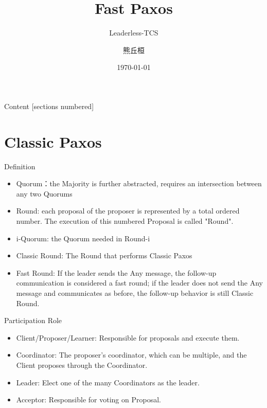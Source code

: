 \documentclass[10pt]{beamer}
\title{Fast Paxos}
\subtitle{Leaderless-TCS}
\date{\today}
\author{熊丘桓}
\institute{NJU-Software Institute}
\begin{document}
\maketitle

\begin{frame}{Content}
    [sections numbered]
    \tableofcontents[hideallsubsections]
\end{frame}

\section{Classic Paxos}

\begin{frame}[fragile]{Definition}
    \begin{itemize}
        \item Quorum：the Majority is further abstracted, requires an intersection between any two Quorums
        \item Round: each proposal of the proposer is represented by a total ordered number. The execution of this numbered Proposal is called "Round".
        \item i-Quorum: the Quorum needed in Round-i
        \item Classic Round: The Round that performs Classic Paxos
        \item Fast Round: If the leader sends the Any message, the follow-up communication is considered a fast round;
              if the leader does not send the Any message and communicates as before, the follow-up behavior is still Classic Round.
    \end{itemize}
\end{frame}

\begin{frame}[fragile]{Participation Role}
    \begin{itemize}
        \item Client/Proposer/Learner: Responsible for proposals and execute them.
        \item Coordinator: The proposer's coordinator, which can be multiple, and the Client proposes through the Coordinator.
        \item Leader: Elect one of the many Coordinators as the leader.
        \item Acceptor: Responsible for voting on Proposal.
    \end{itemize}
\end{frame}
\end{document}
